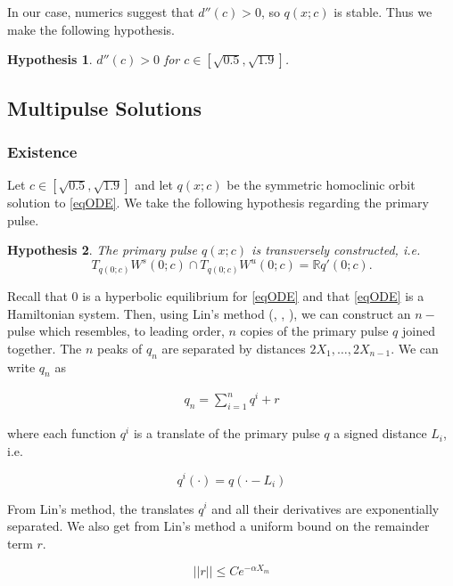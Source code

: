 \documentclass[12pt]{article}
\def\R{{\mathbb R}}
\newtheorem{hypothesis}{Hypothesis}
\begin{document}
In our case, numerics suggest that $d''(c) > 0$, so $q(x; c)$ is stable. Thus we make the following hypothesis.

\begin{hypothesis}\label{hypdccpos}
$d''(c) > 0$ for $c \in [\sqrt{0.5}, \sqrt{1.9}]$.
\end{hypothesis}


\subsection{Multipulse Solutions}

\subsubsection{Existence}

Let $c \in [\sqrt{0.5}, \sqrt{1.9}]$ and let $q(x; c)$ be the symmetric homoclinic orbit solution to \eqref{eqODE}. We take the following hypothesis regarding the primary pulse.

\begin{hypothesis}\label{transverseq}
The primary pulse $q(x; c)$ is transversely constructed, i.e. 
\[
T_{q(0; c)} W^s(0; c) \cap T_{q(0; c)} W^u(0; c) = \R q'(0; c).
\]
\end{hypothesis}

Recall that 0 is a hyperbolic equilibrium for \eqref{eqODE} and that \eqref{eqODE} is a Hamiltonian system. Then, using Lin's method (\cite{Sanstede1993}, \cite{Sandstede1998}, \cite{Sandstede1997}), we can construct an $n-$pulse which resembles, to leading order, $n$ copies of the primary pulse $q$ joined together. The $n$ peaks of $q_n$ are separated by distances $2 X_1, \dots, 2 X_{n-1}$. We can write $q_n$ as 

\begin{align}\label{qn}
q_n = \sum_{i = 1}^{n} q^i + r
\end{align}

where each function $q^i$ is a translate of the primary pulse $q$ a signed distance $L_i$, i.e. 

\begin{equation}\label{qi}
q^i(\cdot) = q(\cdot - L_i)
\end{equation}

From Lin's method, the translates $q^i$ and all their derivatives are exponentially separated. We also get from Lin's method a uniform bound on the remainder term $r$.

\begin{equation}
||r|| \leq C e^{-\alpha X_m}
\end{equation}
\end{document}
